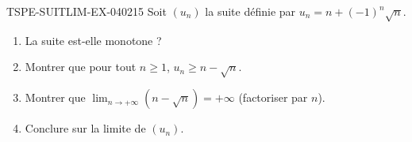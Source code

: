 \begin{exercice}{TSPE-SUITLIM-EX-040}{2}{15}
Soit $(u_n)$ la suite définie par $u_n = n + (-1)^n\sqrt{n}$.
\begin{enumerate}
  \item La suite est-elle monotone ?
  \item Montrer que pour tout $n \geq 1$, $u_n \geq n - \sqrt{n}$.
  \item Montrer que $\lim_{n \to +\infty}(n - \sqrt{n}) = +\infty$ (factoriser par $n$).
  \item Conclure sur la limite de $(u_n)$.
\end{enumerate}
\end{exercice}
